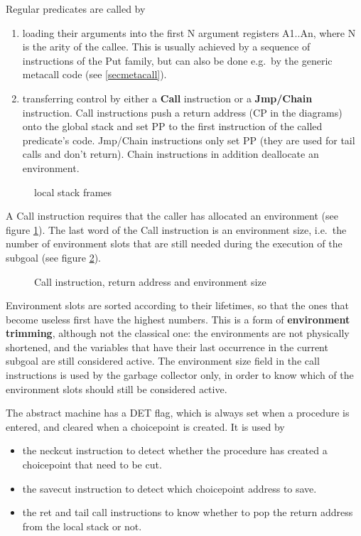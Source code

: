 Regular predicates are called by
\begin{enumerate}
\item loading their arguments into the
first N argument registers A1..An, where N is the arity of the callee.
This is usually achieved by a sequence of instructions of the Put family,
but can also be done e.g.\ by the generic metacall code (see \ref{secmetacall}).
\item transferring control by either a {\bf Call} instruction or
a {\bf Jmp/Chain} instruction. Call instructions push a return address
(CP in the diagrams) onto the global stack and set PP to the first
instruction of the called predicate's code.
Jmp/Chain instructions only set PP (they are used for tail calls and
don't return). Chain instructions in addition deallocate an environment.
\end{enumerate}
\begin{figure}
\label{localframes}
\caption{{\eclipse} local stack frames}
\end{figure}
A Call instruction requires that the caller has allocated an
environment  (see figure \ref{localframes}).
The last word of the Call instruction is an environment
size, i.e.\ the number of environment slots that are still needed
during the execution of the subgoal (see figure \ref{callinstr}). 
\begin{figure}
\label{callinstr}
\caption{Call instruction, return address and environment size}
\end{figure}
Environment slots are sorted according to their lifetimes, so that the
ones that become useless first have the highest numbers.  This is a
 form of {\bf environment trimming}, although not the
classical one:  the environments are not physically shortened, and the
variables that have their last occurrence in the current subgoal are
still considered active.
The environment size field in the call instructions is used by the
garbage collector only, in order to know which of the environment
slots should still be considered active.

The abstract machine has a DET  flag, which is always set when a procedure
is entered, and cleared when a choicepoint is created. It is used by
\begin{itemize}
\item 
the neckcut  instruction to detect whether the procedure has created
a choicepoint that need to be cut.
\item 
the savecut instruction to detect which choicepoint address to save.
\item 
the ret and tail call instructions to know whether to pop the return
address from the local stack or not.
\end{itemize}



